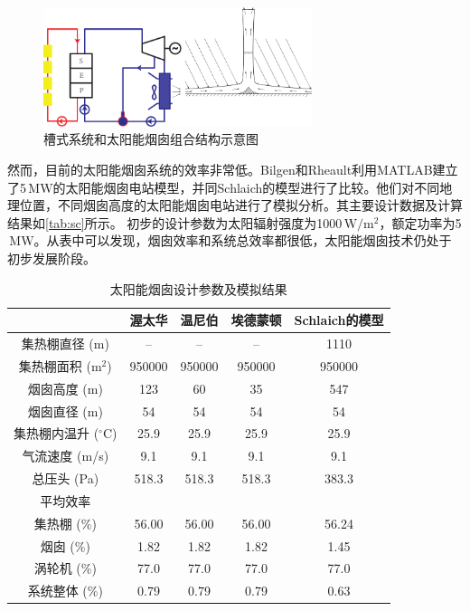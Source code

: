 \begin{figure}[!ht]
\centering 
\includegraphics[width=0.7\textwidth]{fig/CombinedSolarChimney}
\caption{槽式系统和太阳能烟囱组合结构示意图}\label{fig:CombinedSolarChimney}
\end{figure}
然而，目前的太阳能烟囱系统的效率非常低。Bilgen和Rheault利用MATLAB建立了5$\,\mathrm{MW}$的太阳能烟囱电站模型，并同Schlaich的模型进行了比较\cite{Bilgen2005}。他们对不同地理位置，不同烟囱高度的太阳能烟囱电站进行了模拟分析。其主要设计数据及计算结果如\autoref{tab:sc}所示。 初步的设计参数为太阳辐射强度为1000$\,\mathrm{W/m^2}$，额定功率为5$\,\mathrm{MW}$。从表中可以发现，烟囱效率和系统总效率都很低，太阳能烟囱技术仍处于初步发展阶段。
\begin{table}[htbp]
\setlength{\abovecaptionskip}{0pt}
	\caption{太阳能烟囱设计参数及模拟结果}
	\centering
	\begin{tabular}{ccccc}
		\toprule
			&渥太华    &温尼伯    &埃德蒙顿    &Schlaich的模型\\
		\midrule
		集热棚直径 (m)    &	--	&	--	&	--	&	1110 \\
  集热棚面积 ($\mathrm{m^2}$)    & 950000    & 950000	&	950000	&	950000\\
  烟囱高度 (m)    &123    &60    &    35&    547\\
  烟囱直径 (m)    &54    &54    &54    &54\\
  集热棚内温升 ($\mathrm{^\circ C}$)    &25.9    &25.9    &25.9    &25.9\\
  气流速度 (m/s)&9.1    &9.1    &9.1    &9.1\\
  总压头 (Pa)&518.3    &518.3    &518.3    &383.3\\
  平均效率\\
  集热棚 (\%)    &56.00    &56.00    &56.00    &56.24\\
  烟囱 (\%)    &1.82    &1.82    &1.82    &1.45\\
  涡轮机 (\%)    &77.0    &77.0    &77.0    &77.0\\
  系统整体 (\%)    &0.79    &0.79    &0.79    &0.63\\
		\bottomrule
	\end{tabular}
	\label{tab:sc}
\end{table}
 
